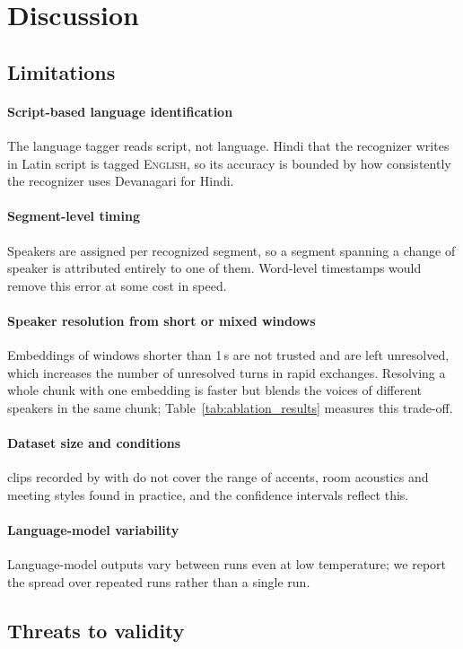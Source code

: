 \section{Discussion}
\label{sec:discussion}


\subsection{Limitations}
\paragraph{Script-based language identification}
The language tagger reads script, not language. Hindi that the recognizer
writes in Latin script is tagged \textsc{English}, so its accuracy is bounded by
how consistently the recognizer uses Devanagari for Hindi.

\paragraph{Segment-level timing}
Speakers are assigned per recognized segment, so a segment spanning a change of
speaker is attributed entirely to one of them. Word-level timestamps would
remove this error at some cost in speed.

\paragraph{Speaker resolution from short or mixed windows}
Embeddings of windows shorter than 1\,s are not trusted and are left unresolved,
which increases the number of unresolved turns in rapid exchanges. Resolving a
whole chunk with one embedding is faster but blends the voices of different
speakers in the same chunk; Table~\ref{tab:ablation_results} measures this
trade-off.

\paragraph{Dataset size and conditions}
 clips recorded by  with  do
not cover the range of accents, room acoustics and meeting styles found in
practice, and the confidence intervals reflect this.

\paragraph{Language-model variability}
Language-model outputs vary between runs even at low temperature; we report the
spread over repeated runs rather than a single run.

\subsection{Threats to validity}
